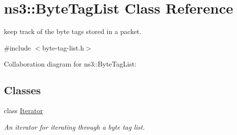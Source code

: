 \hypertarget{classns3_1_1ByteTagList}{}\section{ns3\+:\+:Byte\+Tag\+List Class Reference}
\label{classns3_1_1ByteTagList}


keep track of the byte tags stored in a packet.  




{\ttfamily \#include $<$byte-\/tag-\/list.\+h$>$}



Collaboration diagram for ns3\+:\+:Byte\+Tag\+List\+:
\subsection*{Classes}
\begin{DoxyCompactItemize}
\item 
class \hyperlink{classns3_1_1ByteTagList_1_1Iterator}{Iterator}
\begin{DoxyCompactList}\small\item\em An iterator for iterating through a byte tag list. \end{DoxyCompactList}\end{DoxyCompactItemize}

